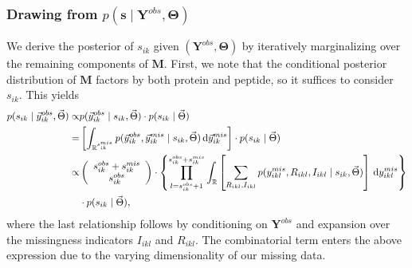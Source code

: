\subsubsection{Drawing from $p(\bm s \mid \bm {Y}^{obs}, \bm{\Theta})$} \label{proteomics:sc:draw_s_ik_mis} 

We derive the posterior of $s_{ik}$ given $(\bm {Y}^{obs}, \bm{\Theta})$ by iteratively marginalizing over the remaining components of $\bm M$.
First, we note that the conditional posterior distribution of $\bm M$ factors by both protein and peptide, so it suffices to consider $s_{ik}$.
This yields
%
\begin{align}
 p( s_{ik} \mid \vec{y}_{ik}^{obs}, \vec{\Theta} ) \propto& p( \vec{y}_{ik}^{obs} \mid s_{ik}, \vec{\Theta} ) \cdot p(s_{ik} \mid \vec{\Theta} ) \\
 =&
\left[ \int_{\mathbb{R}^{s_{ik}^{mis}}} p(\vec{y}_{ik}^{obs}, \vec{y}_{ik}^{mis} \mid s_{ik}, \vec{\Theta}) \, \mathrm{d}\vec{y}_{ik}^{mis} \right] \cdot p(s_{ik} \mid \vec{\Theta}) \\
\nonumber
\propto&
\left(\begin{array}{c}
s_{ik}^{obs}+s_{ik}^{mis}\\
s_{ik}^{obs}
\end{array}\right) \cdot
\left\{ 
\prod_{l=s_{ik}^{obs}+1}^{s_{ik}^{obs}+s_{ik}^{mis}} \int_{\mathbb{R}}
\left[ \sum_{R_{ikl},I_{ikl}} 
p(y_{ikl}^{mis}, R_{ikl},I_{ikl} \mid s_{ik}, \vec{\Theta}) 
\right]
\, \mathrm{d}y_{ikl}^{mis} 
\right\} \\
&\cdot p(s_{ik} \mid \vec{\Theta}) ,
\end{align}
where the last relationship follows by conditioning on $\bm{Y}^{obs}$ and expansion over the missingness indicators $I_{ikl}$ and $R_{ikl}$.
The combinatorial term enters the above expression due to the varying dimensionality of our missing data.

